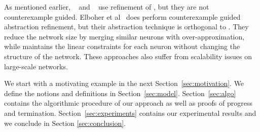 {As mentioned earlier, \deepsrgr{}~\cite{yang2021improving} and \kpoly{}~\cite{singh2019beyond} use refinement of \deeppoly{}, 
but they are not counterexample guided. Elboher et al~\cite{elboher2020abstraction} does perform 
counterexample guided abstraction refinement, but their abstraction technique is orthogonal to \deeppoly{}.  
They reduce the network size by merging similar  neurons with over-approximation, while \deeppoly{} maintains 
the linear constraints for each neuron without changing the structure of the network. 
These approaches also suffer from scalability issues on large-scale networks.

}




\medskip

 We start with a motivating example in the next Section~\ref{sec:motivation}.  We define the notions and definitions in Section~\ref{sec:model}. Section~\ref{sec:algo} contains the algorithmic procedure of our approach as well as proofs of progress and termination. Section~\ref{sec:experiments} contains our experimental results and we conclude in Section \ref{sec:conclusion}.




